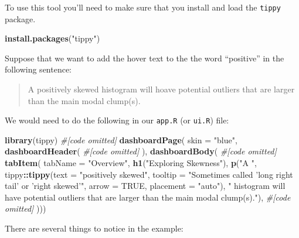 \documentclass[
]{book}
\newenvironment{Shaded}{\begin{snugshade}}{\end{snugshade}}
\newcommand{\CommentTok}[1]{\textcolor[rgb]{0.56,0.35,0.01}{\textit{#1}}}
\newcommand{\DataTypeTok}[1]{\textcolor[rgb]{0.13,0.29,0.53}{#1}}
\newcommand{\KeywordTok}[1]{\textcolor[rgb]{0.13,0.29,0.53}{\textbf{#1}}}
\newcommand{\NormalTok}[1]{#1}
\newcommand{\OperatorTok}[1]{\textcolor[rgb]{0.81,0.36,0.00}{\textbf{#1}}}
\newcommand{\OtherTok}[1]{\textcolor[rgb]{0.56,0.35,0.01}{#1}}
\newcommand{\StringTok}[1]{\textcolor[rgb]{0.31,0.60,0.02}{#1}}
\begin{document}
To use this tool you'll need to make sure that you install and load the \texttt{tippy} package.

\begin{Shaded}
\begin{Highlighting}[]
\KeywordTok{install.packages}\NormalTok{(}\StringTok{"tippy"}\NormalTok{)}
\end{Highlighting}
\end{Shaded}

Suppose that we want to add the hover text to the the word ``positive'' in the following sentence:

\begin{quote}
A positively skewed histogram will hoave potential outliers that are larger than the main modal clump(s).
\end{quote}

We would need to do the following in our \texttt{app.R} (or \texttt{ui.R}) file:

\begin{Shaded}
\begin{Highlighting}[]
\KeywordTok{library}\NormalTok{(tippy)}
\CommentTok{#[code omitted]}
\KeywordTok{dashboardPage}\NormalTok{(}
    \DataTypeTok{skin =} \StringTok{"blue"}\NormalTok{,}
    \KeywordTok{dashboardHeader}\NormalTok{(}
        \CommentTok{#[code omitted]}
\NormalTok{    ),}
    \KeywordTok{dashboardBody}\NormalTok{(}
        \CommentTok{#[code omitted]}
        \KeywordTok{tabItem}\NormalTok{(}
            \DataTypeTok{tabName =} \StringTok{"Overview"}\NormalTok{,}
            \KeywordTok{h1}\NormalTok{(}\StringTok{"Exploring Skewness"}\NormalTok{),}
            \KeywordTok{p}\NormalTok{(}\StringTok{"A "}\NormalTok{,}
\NormalTok{              tippy}\OperatorTok{::}\KeywordTok{tippy}\NormalTok{(}\DataTypeTok{text =} \StringTok{"positively skewed"}\NormalTok{,}
                           \DataTypeTok{tooltip =} \StringTok{"Sometimes called 'long right tail' or 'right skewed'"}\NormalTok{,}
                           \DataTypeTok{arrow =} \OtherTok{TRUE}\NormalTok{, }\DataTypeTok{placement =} \StringTok{"auto"}\NormalTok{),}
            \StringTok{" histogram will have potential outliers that are larger than}
\StringTok{            the main modal clump(s)."}\NormalTok{),}
    \CommentTok{#[code omitted]}
\NormalTok{        ))) }
\end{Highlighting}
\end{Shaded}

There are several things to notice in the example:
\end{document}
